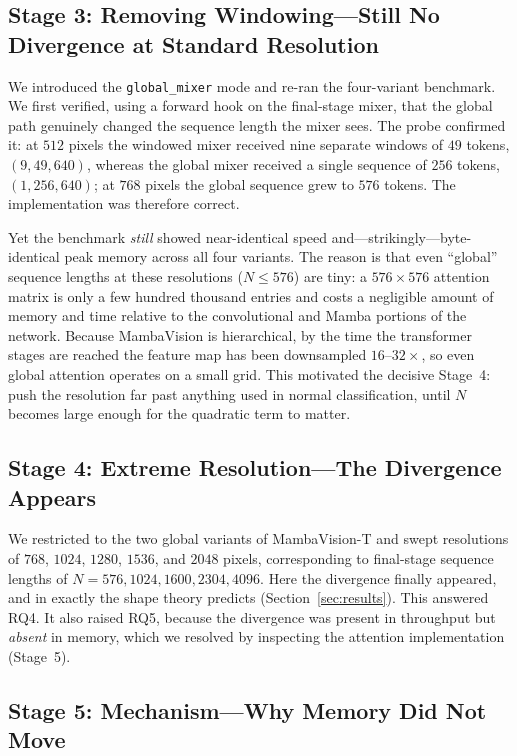 \documentclass[11pt,a4paper]{article}
\begin{document}
\subsection{Stage 3: Removing Windowing---Still No Divergence at Standard Resolution}

We introduced the \texttt{global\_mixer} mode and re-ran the four-variant benchmark. We first verified, using a forward hook on the final-stage mixer, that the global path genuinely changed the sequence length the mixer sees. The probe confirmed it: at $512$ pixels the windowed mixer received nine separate windows of $49$ tokens, $(9, 49, 640)$, whereas the global mixer received a single sequence of $256$ tokens, $(1, 256, 640)$; at $768$ pixels the global sequence grew to $576$ tokens. The implementation was therefore correct.

Yet the benchmark \emph{still} showed near-identical speed and---strikingly---byte-identical peak memory across all four variants. The reason is that even ``global'' sequence lengths at these resolutions ($N \le 576$) are tiny: a $576\times576$ attention matrix is only a few hundred thousand entries and costs a negligible amount of memory and time relative to the convolutional and Mamba portions of the network. Because MambaVision is hierarchical, by the time the transformer stages are reached the feature map has been downsampled $16$--$32\times$, so even global attention operates on a small grid. This motivated the decisive Stage~4: push the resolution far past anything used in normal classification, until $N$ becomes large enough for the quadratic term to matter.

\subsection{Stage 4: Extreme Resolution---The Divergence Appears}

We restricted to the two global variants of MambaVision-T and swept resolutions of $768$, $1024$, $1280$, $1536$, and $2048$ pixels, corresponding to final-stage sequence lengths of $N = 576, 1024, 1600, 2304, 4096$. Here the divergence finally appeared, and in exactly the shape theory predicts (Section~\ref{sec:results}). This answered RQ4. It also raised RQ5, because the divergence was present in throughput but \emph{absent} in memory, which we resolved by inspecting the attention implementation (Stage~5).

\subsection{Stage 5: Mechanism---Why Memory Did Not Move}
\end{document}
